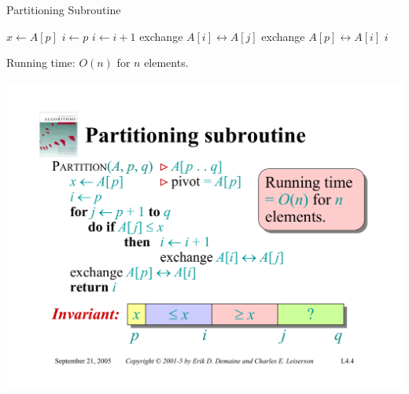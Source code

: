 \documentclass{beamer}
\begin{document}
\begin{frame}{Partitioning Subroutine}
    \begin{minipage}{0.58\textwidth}
        \begin{algorithm}[H]
            \begin{algorithmic}[1]
                    \State $x \leftarrow A[p]$
                    \State $i \leftarrow p$
                            \State $i \leftarrow i + 1$
                            \State exchange $A[i] \leftrightarrow A[j]$
                        \EndIf
                    \EndFor
                    \State exchange $A[p] \leftrightarrow A[i]$
                    \State \Return $i$
                \EndProcedure
            \end{algorithmic}
        \end{algorithm}
    \end{minipage}
    \hfill
    \begin{minipage}{0.38\textwidth}
        \begin{alertblock}{Running time:}
            $O(n)$ for $n$ elements.
        \end{alertblock}
        \vspace{4.5cm}
    \end{minipage}
    \includegraphics[width=\textwidth, trim={1.75cm 1.50cm 2.50cm 14.30cm}, clip]{pages/lec4_4} 
\end{frame}
\end{document}
